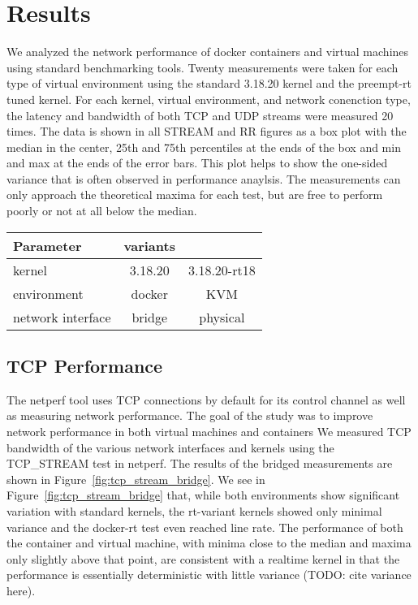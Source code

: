 \chapter{Results}
\label{sec:results}
We analyzed the network performance of docker containers and virtual machines using standard benchmarking tools.  
Twenty measurements were taken for each type of virtual environment using the standard 3.18.20 kernel and the preempt-rt tuned kernel.
For each kernel, virtual environment, and network conenction type, the latency and bandwidth of both TCP and UDP streams were measured 20 times.
The data is shown in all STREAM and RR figures as a box plot with the median in the center, 25th and 75th percentiles at the ends of the box and min and max at the ends of the error bars.
This plot helps to show the one-sided variance that is often observed in performance anaylsis.  
The measurements can only approach the theoretical maxima for each test, but are free to perform poorly or not at all below the median.  

\begin{table}[ht!]
    \centering
    \begin{tabular}{|l|c|c|}
    \hline
    Parameter & variants & \\
    \hline \hline
    kernel & 3.18.20 & 3.18.20-rt18 \\ 
    environment & docker & KVM \\ 
    network interface & bridge & physical \\ 
    \hline
    \end{tabular}
\end{table}

\section{TCP Performance} %
\label{sec:tcp_performance}
The netperf tool uses TCP connections by default for its control channel as well as measuring network performance. 
    The goal of the study was to improve network performance in both virtual machines and containers 
We measured TCP bandwidth of the various network interfaces and kernels using the TCP\_STREAM test in netperf.
The results of the bridged measurements are shown in Figure~\ref{fig:tcp_stream_bridge}.
We see in Figure~\ref{fig:tcp_stream_bridge} that, while both environments show significant variation with standard kernels, the rt-variant kernels showed only minimal variance and the docker-rt test even reached line rate.  
The performance of both the container and virtual machine, with minima close to the median and maxima only slightly above that point, are consistent with a realtime kernel in that the performance is essentially deterministic with little variance (TODO: cite variance here).

